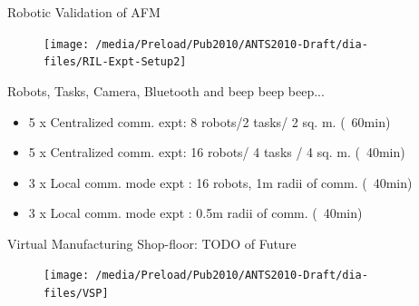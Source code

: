 \documentclass{beamer}
\begin{document}
\begin{frame}[t]{Robotic Validation of AFM}
\begin{figure}
\centering
\texttt{[image: /media/Preload/Pub2010/ANTS2010-Draft/dia-files/RIL-Expt-Setup2]}
\label{fig:setup} %
\end{figure}
 \begin{block}{Robots, Tasks, Camera, Bluetooth and \alert{beep beep beep...} }
 \begin{scriptsize}
    \begin{itemize}
    \item 5 x Centralized comm. expt: 8 robots/2 tasks/ 2 sq. m. (~60min)
    \item 5 x Centralized comm. expt: 16 robots/ 4 tasks / 4 sq. m. (~40min)
    \item 3 x Local comm. mode expt : 16 robots, 1m radii of comm. (~40min)
    \item 3 x Local comm. mode expt : 0.5m radii of comm. (~40min)
    \end{itemize}
 \end{scriptsize}
  \end{block}
\end{frame}

\begin{frame}[t]{Virtual Manufacturing Shop-floor: \alert{TODO of Future}}
\begin{figure}
\centering
\texttt{[image: /media/Preload/Pub2010/ANTS2010-Draft/dia-files/VSP]}
\label{fig:setup} %
\end{figure}
\end{frame}
\end{document}
